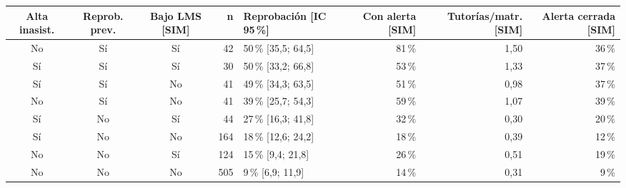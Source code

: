 \begin{tabular}{cccrlrrr}
\toprule
Alta inasist. & Reprob. prev. & Bajo LMS [SIM] & n & Reprobación [IC 95\,\%] & Con alerta [SIM] & Tutorías/matr. [SIM] & Alerta cerrada [SIM] \\
\midrule
No & Sí & Sí & 42 & 50\,\% [35,5; 64,5] & 81\,\% & 1,50 & 36\,\% \\
Sí & Sí & Sí & 30 & 50\,\% [33,2; 66,8] & 53\,\% & 1,33 & 37\,\% \\
Sí & Sí & No & 41 & 49\,\% [34,3; 63,5] & 51\,\% & 0,98 & 37\,\% \\
No & Sí & No & 41 & 39\,\% [25,7; 54,3] & 59\,\% & 1,07 & 39\,\% \\
Sí & No & Sí & 44 & 27\,\% [16,3; 41,8] & 32\,\% & 0,30 & 20\,\% \\
Sí & No & No & 164 & 18\,\% [12,6; 24,2] & 18\,\% & 0,39 & 12\,\% \\
No & No & Sí & 124 & 15\,\% [9,4; 21,8] & 26\,\% & 0,51 & 19\,\% \\
No & No & No & 505 & 9\,\% [6,9; 11,9] & 14\,\% & 0,31 & 9\,\% \\
\bottomrule
\end{tabular}
